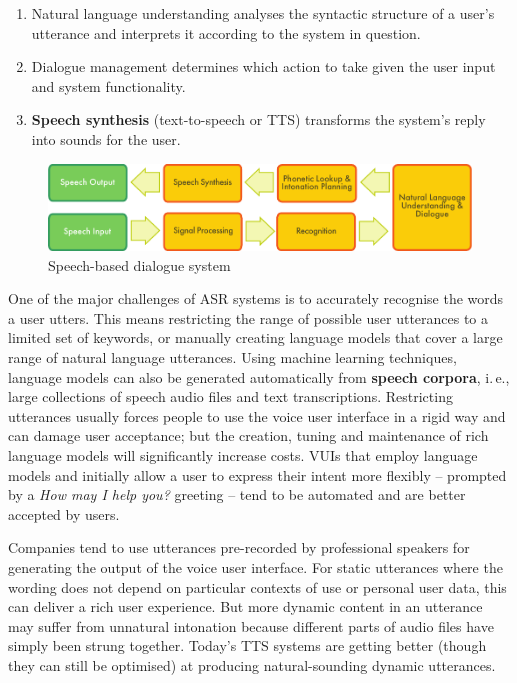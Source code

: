 \begin{multicols}{2}
\begin{enumerate}
\item Natural language understanding analyses the syntactic structure of a user’s
    utterance and interprets it according to the system in question.

\item Dialogue management determines which action to take given the user input
    and system functionality.

\item \textbf{Speech synthesis} (text-to-speech or TTS) transforms the system’s reply into
    sounds for the user.
\end{enumerate}

\begin{figure}[htb]
  \center
  \includegraphics[width=\textwidth]{../_media/english/simple_speech-based_dialogue_architecture}
  \caption{Speech-based dialogue system}
  \label{fig:dialoguearch-eng}
\end{figure}

One of the major challenges of ASR systems is to accurately recognise the words a user utters. This means restricting the range of possible user utterances to a limited set of keywords, or manually creating language models that cover a large range of natural language utterances. Using machine learning techniques, language models can also be generated automatically from \textbf{speech corpora}, i.\,e., large collections of speech audio files and text transcriptions. Restricting utterances usually forces people to use the voice user interface in a rigid way and can damage user acceptance; but the creation, tuning and maintenance of rich language models will significantly increase costs. VUIs that employ language models and initially allow a user to express their intent more flexibly -- prompted by a \textit{How may I help you?} greeting -- tend to be automated and are better accepted by users.

Companies tend to use utterances pre-recorded by professional speakers for generating the output of the voice user interface. For static utterances where the wording does not depend on particular contexts of use or personal user data, this can deliver a rich user experience. But more dynamic content in an utterance may suffer from unnatural intonation because different parts of audio files have simply been strung together. Today’s TTS systems are getting better (though they can still be optimised) at producing natural-sounding dynamic utterances.


\end{multicols}
